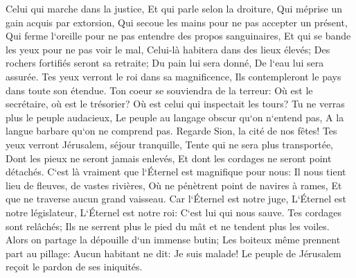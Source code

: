 \verse Celui qui marche dans la justice, Et qui parle selon la droiture, Qui méprise un gain acquis par extorsion, Qui secoue les mains pour ne pas accepter un présent, Qui ferme l`oreille pour ne pas entendre des propos sanguinaires, Et qui se bande les yeux pour ne pas voir le mal, 
\verse Celui-là habitera dans des lieux élevés; Des rochers fortifiés seront sa retraite; Du pain lui sera donné, De l`eau lui sera assurée. 
\verse Tes yeux verront le roi dans sa magnificence, Ils contempleront le pays dans toute son étendue. 
\verse Ton coeur se souviendra de la terreur: Où est le secrétaire, où est le trésorier? Où est celui qui inspectait les tours? 
\verse Tu ne verras plus le peuple audacieux, Le peuple au langage obscur qu`on n`entend pas, A la langue barbare qu`on ne comprend pas. 
\verse Regarde Sion, la cité de nos fêtes! Tes yeux verront Jérusalem, séjour tranquille, Tente qui ne sera plus transportée, Dont les pieux ne seront jamais enlevés, Et dont les cordages ne seront point détachés. 
\verse C`est là vraiment que l`Éternel est magnifique pour nous: Il nous tient lieu de fleuves, de vastes rivières, Où ne pénètrent point de navires à rames, Et que ne traverse aucun grand vaisseau. 
\verse Car l`Éternel est notre juge, L`Éternel est notre législateur, L`Éternel est notre roi: C`est lui qui nous sauve. 
\verse Tes cordages sont relâchés; Ils ne serrent plus le pied du mât et ne tendent plus les voiles. Alors on partage la dépouille d`un immense butin; Les boiteux même prennent part au pillage: 
\verse Aucun habitant ne dit: Je suis malade! Le peuple de Jérusalem reçoit le pardon de ses iniquités. 

